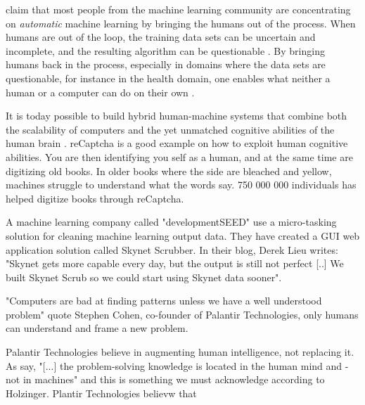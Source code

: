 \citep{Holzinger2016} claim that most people from the machine learning community are concentrating on \textit{automatic} machine learning by bringing the humans out of the process. When humans are out of the loop, the training data sets can be uncertain and incomplete, and the resulting algorithm can be questionable \citep{Holzinger2016}. By bringing humans back in the process, especially in domains where the data sets are questionable, for instance in the health domain, one enables what neither a human or a computer can do on their own \citep{Holzinger2016}. 

It is today possible to build hybrid human-machine systems that combine both the scalability of computers and the yet unmatched cognitive abilities of the human brain \citep{Difallah2016}. reCaptcha is a good example on how to exploit human cognitive abilities. You are then identifying you self as a human, and at the same time are digitizing old books. In older books where the side are bleached and yellow, machines struggle to understand what the words say. 750 000 000 individuals has helped digitize books through reCaptcha. %

A machine learning company called "developmentSEED" use a micro-tasking solution for cleaning machine learning output data. They have created a GUI web application solution called Skynet Scrubber. In their blog, Derek Lieu writes: "Skynet gets more capable every day, but the output is still not perfect [..] We built Skynet Scrub so we could start using Skynet data sooner". 

"Computers are bad at finding patterns unless we have a well understood problem" quote Stephen Cohen, co-founder of Palantir Technologies, only humans can understand and frame a new problem. %

Palantir Technologies believe in augmenting human intelligence, not replacing it. As \cite{Holzinger2013} say, "[...] the problem-solving knowledge is located in the human mind and - not in machines" and this is something we must acknowledge according to Holzinger. Plantir Technologies believw that 
 
